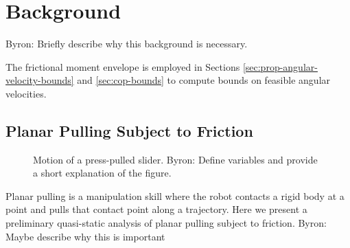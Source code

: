 \documentclass[conference]{IEEEtran}
\newcommand{\BB}[1]{{\color{red} {Byron: {#1}}}}
\begin{document}
\section{Background}\label{sec:theory}
\BB{Briefly describe why this background is necessary. }

The frictional moment envelope is employed in Sections
\ref{sec:prop-angular-velocity-bounds} and \ref{sec:cop-bounds} to
compute bounds on feasible angular velocities.

\subsection{Planar Pulling Subject to Friction}\label{sec:planar-pulling}

\begin{figure}[t]
  \centering
  \def\iangle{35} %
  \caption{Motion of a press-pulled slider. \BB{Define variables and provide a short explanation of the figure.}}
  \label{fig:presspull-motion}
\end{figure}


 Planar pulling is a manipulation skill where
the robot contacts a rigid body at a point and pulls that contact
point along a trajectory. Here we present a preliminary quasi-static analysis of planar pulling
subject to friction. \BB{Maybe describe why this is important}
\end{document}
